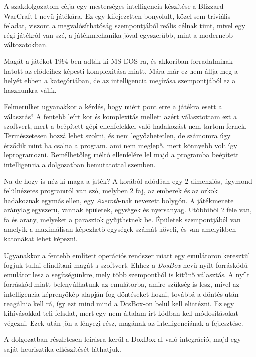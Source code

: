 
A szakdolgozatom célja egy mesterséges intelligencia készítése a Blizzard WarCraft I nevű játékára.
Ez egy kifejezetten bonyolult, közel sem triviális feladat, viszont a megvalósíthatóság szempontjából reális célnak tünt, mivel egy régi játékról van szó, a játékmechanika jóval egyszerűbb, mint a modernebb változatokban.

Magát a játékot 1994-ben adták ki MS-DOS-ra, és akkoriban forradalminak hatott az elődeihez képesti komplexitása miatt. Mára már ez nem állja meg a helyét ebben a kategóriában, de az intelligencia megírása szempontjából ez a hasznunkra válik. 

Felmerülhet ugyanakkor a kérdés, hogy miért pont erre a játékra esett a választás? A fentebb leírt kor és komplexitás mellett azért választottam ezt a szoftvert, mert a beépített gépi ellenfelekkel való hadakozást nem tartom fernek. Természetesen hozzá lehet szokni, és nem legyőzhetetlen, de számomra úgy érződik mint ha csalna a program, ami nem meglepő, mert könnyebb volt így leprogramozni. Remélhetőleg méltó ellenfelére lel majd a programba beépített intelligencia a dolgozatban bemutatottal szemben.

Na de hogy is néz ki maga a játék? A korából adódóan egy 2 dimenziós, úgymond felülnézetes programról van szó, melyben 2 faj, az emberek és az orkok hadakoznak egymás ellen, egy \textit{Azeroth}-nak nevezett bolygón. A játékmenete aránylag egyszerű, vannak épületek, egységek és nyersanyag. Utóbbiból 2 féle van, fa és arany, melyeket a parasztok gyűjthetnek be. Épületek szempontjából van amelyik a maximálisan képezhető egységek számát növeli, és van amelyikben katonákat lehet képezni. 

Ugyanakkor a fentebb említett operációs rendszer miatt egy emulátoron keresztül fogjuk tudni elindítani magát a szoftvert. Ehhez a \textit{DosBox} nevű nyílt forráskódú emulátor lesz a segítségünkre, mely több szempontból is kitűnő választás. A nyílt forráskód miatt belenyúlhatunk az emulátorba, amire szükség is lesz, mivel az intelligencia képrenyőkép alapján fog döntéseket hozni, továbbá a döntés után reagálnia kell rá, így ezt mind mind a DosBox-on belül kell elintézni. Ez egy kihívásokkal teli feladat, mert egy nem általam írt kódban kell módosításokat végezni. Ezek után jön a lényegi rész, magának az intelligenciának a fejlesztése. 

A dolgozatban részletesen leírásra kerül a DoxBox-al való integráció, majd egy saját heurisztika elkészítését láthatjuk.
